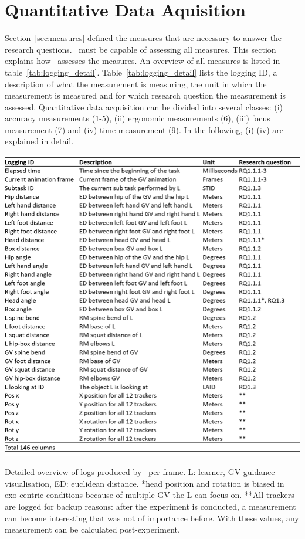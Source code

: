 \section{Quantitative Data Aquisition}
\label{sec:logging}
Section~\ref{sec:measures} defined the measures that are necessary to answer the research questions. \exgo\ must be capable of assessing all measures. This section explains how \exgo\ assesses the measures. An overview of all measures is listed in table~\ref{tab:logging_detail}. Table~\ref{tab:logging_detail} lists the logging ID, a description of what the measurement is measuring, the unit in which the measurement is measured and for which research question the measurement is assessed. Quantitative data acquisition can be divided into several classes: (i) accuracy measurements (1-5), (ii) ergonomic measurements (6), (iii) focus measurement (7) and (iv) time measurement (9). In the following, (i)-(iv) are explained in detail.
\begin{table}[H]
	\centering
	\includegraphics[width=\textwidth]{figures/logging_detail.png}
	\caption[Logfile description]{Detailed overview of logs produced by \exgo\ per frame. L: learner, GV guidance visualisation, ED: euclidean distance. *head position and rotation is biased in exo-centric conditions because of multiple GV the L can focus on. **All trackers are logged for backup reasons: after the experiment is conducted, a measurement can become interesting that was not of importance before. With these values, any measurement can be calculated post-experiment.}
	\label{tab:logging_detail}
\end{table}

